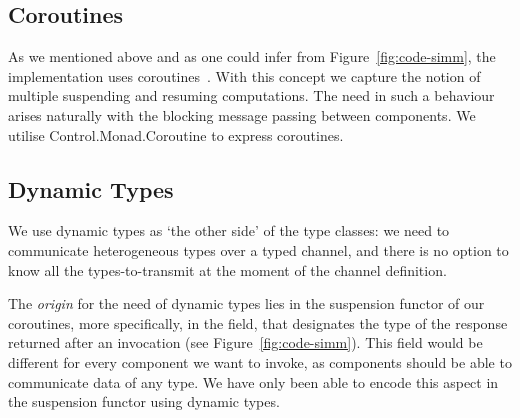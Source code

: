\subsection{Coroutines}
\label{sec:impl-coroutines}
As we mentioned above and as one could infer from Figure~\ref{fig:code-simm}, the implementation uses coroutines~\cite{coroutines}.
With this concept we capture the notion of multiple suspending and resuming computations.
The need in such a behaviour arises naturally with the blocking message passing between components.
We utilise \textsf{Control.Monad.Coroutine} \cite{cmt} to express coroutines.

\subsection{Dynamic Types}
We use dynamic types \cite{Abadi:1991:DTS:103135.103138} as `the other side' of the type classes: we need to communicate heterogeneous types over a typed channel, and there is no option to know all the types-to-transmit at the moment of the channel definition.

The \emph{origin} for the need of dynamic types lies in the suspension functor of our coroutines, more specifically, in the  field, that designates the type of the response returned after an invocation (see Figure~\ref{fig:code-simm}).
This field would be different for every component we want to invoke, as components should be able to communicate data of any type. %
We have only been able to encode this aspect in the suspension functor using dynamic types.



